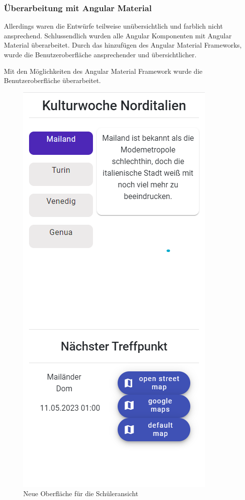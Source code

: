 \subsubsection{Überarbeitung mit Angular Material}

Allerdings waren die Entwürfe teilweise unübersichtlich und farblich nicht ansprechend. Schlussendlich wurden alle Angular Komponenten mit Angular Material überarbeitet. Durch das hinzufügen des Angular Material Frameworks, wurde die Benutzeroberfläche ansprechender und übersichtlicher.

Mit den Möglichkeiten des Angular Material Framework wurde die Benutzeroberfläche überarbeitet.

\begin{figure}[h]
    \centering
    \includegraphics[scale=0.85]{pics/new_view.png}
    \caption{Neue Oberfläche für die Schüleransicht}
    \label{lst:new_view}
\end{figure}



